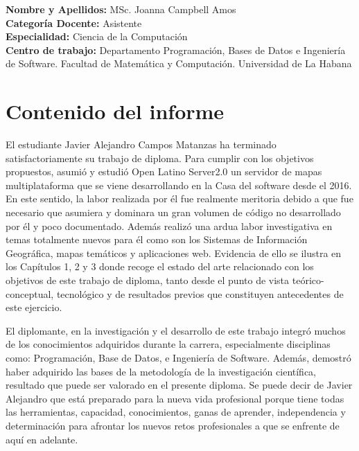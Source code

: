 

{\setlength{\parindent}{0pt} \textbf{Nombre y Apellidos:} MSc. Joanna Campbell Amos}\\
\textbf{Categor\'ia Docente:} Asistente\\
\textbf{Especialidad:} Ciencia de la Computaci\'on\\
\textbf{Centro de trabajo:} Departamento Programaci\'on, Bases de Datos e Ingenier\'ia de Software. Facultad de Matem\'atica y Computaci\'on. Universidad de La Habana

\section*{Contenido del informe}
El estudiante Javier Alejandro Campos Matanzas ha terminado satisfactoriamente  su trabajo de diploma. Para cumplir con los objetivos propuestos, asumi\'o y estudi\'o Open Latino Server2.0 un servidor de mapas multiplataforma que se viene desarrollando en la Casa del software desde el 2016. En este sentido, la labor realizada por \'el fue realmente meritoria debido a que fue necesario que asumiera y dominara un gran volumen de c\'odigo no desarrollado por \'el y poco documentado. Adem\'as realiz\'o una ardua labor investigativa en temas totalmente nuevos para \'el como son los Sistemas de Informaci\'on Geogr\'afica, mapas tem\'aticos y aplicaciones web. Evidencia  de ello se ilustra en los Cap\'itulos 1, 2 y 3 donde recoge el estado del arte relacionado con los objetivos de este trabajo de diploma, tanto desde el punto de vista te\'orico-conceptual, tecnol\'ogico y de resultados previos que constituyen antecedentes de este ejercicio.

El diplomante, en la investigaci\'on y el desarrollo de este trabajo integr\'o muchos de los conocimientos adquiridos durante la carrera, especialmente disciplinas como: Programaci\'on, Base de Datos, e Ingenier\'ia  de Software. Adem\'as, demostr\'o haber adquirido las bases de la metodolog\'ia de la investigaci\'on cient\'ifica, resultado que puede ser valorado en el presente diploma. Se puede decir de Javier Alejandro que est\'a preparado para la nueva vida profesional porque tiene todas las herramientas, capacidad, conocimientos, ganas de aprender, independencia y determinaci\'on para afrontar los nuevos retos profesionales a que se enfrente de aqu\'i en adelante.

